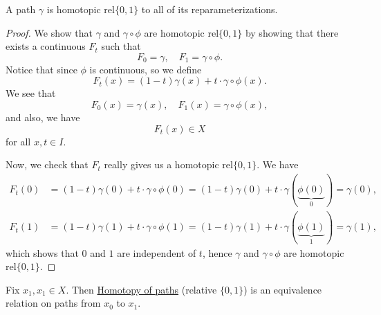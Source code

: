 \begin{exercise}
	A path \(\gamma\) is homotopic \(\mathrm{rel} \{0, 1\}\) to all of its reparameterizations.
\end{exercise}
\begin{proof}
	\par We show that \(\gamma\) and \(\gamma\circ \phi \) are homotopic \(\mathrm{rel} \{0, 1\}\) by showing that there exists a continuous \(F_t\) such that
	\[
		F_0 = \gamma,\quad F_1 = \gamma\circ \phi.
	\]
	Notice that since \(\phi \) is continuous, so we define
	\[
		F_t(x) = (1 - t) \gamma(x) + t\cdot \gamma\circ \phi (x).
	\]
	We see that
	\[
		F_0(x) = \gamma(x),\quad F_1(x) = \gamma\circ \phi (x),
	\]
	and also, we have
	\[
		F_t(x)\in X
	\]
	for all \(x, t\in I\).

	\par Now, we check that \(F_t\) really gives us a homotopic \(\mathrm{rel}\{0, 1\}\). We have
	\[
		\begin{split}
			F_t(0) &= (1 - t)\gamma(0) + t\cdot \gamma\circ \phi (0) = (1 - t)\gamma(0) + t\cdot \gamma(\underbrace{\phi (0)}_{0}) = \gamma(0),\\
			F_t(1) &= (1 - t)\gamma(1) + t\cdot \gamma\circ \phi (1) = (1 - t)\gamma(1) + t\cdot \gamma(\underbrace{\phi (1)}_{1}) = \gamma(1),
		\end{split}
	\]
	which shows that \(0\) and \(1\) are independent of \(t\), hence \(\gamma\) and \(\gamma\circ \phi \) are homotopic \(\mathrm{rel} \{0, 1\}\).
\end{proof}

\begin{exercise}
	Fix \(x_1, x_1\in X\). Then \underline{Homotopy of paths} (relative \(\{0, 1\}\)) is an equivalence relation on paths from \(x_0\) to \(x_1\).
\end{exercise}

